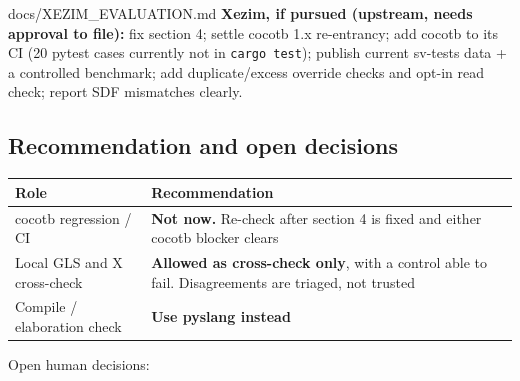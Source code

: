 \begin{relocated}{docs/XEZIM_EVALUATION.md}
\textbf{Xezim, if pursued (upstream, needs approval to file):} fix
section 4; settle cocotb 1.x re-entrancy; add cocotb to its CI (20
pytest cases currently not in \texttt{cargo\ test}); publish current
sv-tests data + a controlled benchmark; add
duplicate/\allowbreak{}excess override checks and opt-in read check;
report SDF mismatches clearly.

\subsection{Recommendation and open decisions}\label{tm:dec:xezim:9-recommendation-and-open-decisions}

{\small\setlength{\tabcolsep}{4pt}

{
\begin{longtable}[]{@{}
  >{\raggedright\arraybackslash}p{}
  >{\raggedright\arraybackslash}p{}@{}}
\toprule\noalign{}
\begin{minipage}[b]{\linewidth}\raggedright
Role
\end{minipage} & \begin{minipage}[b]{\linewidth}\raggedright
Recommendation
\end{minipage} \\
\midrule\noalign{}
\endhead
\bottomrule\noalign{}
\endlastfoot
cocotb regression / CI & \textbf{Not now.} Re-check after section 4 is
fixed and either cocotb blocker clears \\
Local GLS and X cross-check & \textbf{Allowed as cross-check only}, with
a control able to fail. Disagreements are triaged, not trusted \\
Compile / elaboration check & \textbf{Use pyslang instead} \\
\end{longtable}
}

}

Open human decisions:


\end{relocated}
